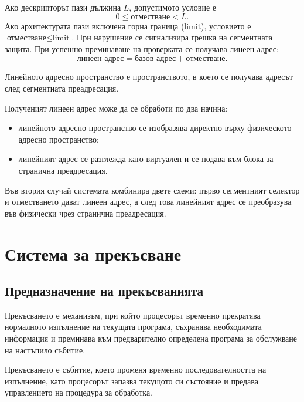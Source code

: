Ако дескрипторът пази дължина $L$, допустимото условие е
\[
0\leq \text{отместване}<L.
\]
Ако архитектурата пази включена горна граница (limit), условието е \(\text{отместване}\leq\text{limit}\). При нарушение се сигнализира грешка на сегментната защита. При успешно преминаване на проверката се получава линеен адрес:
\[
\text{линеен адрес}=\text{базов адрес}+\text{отместване}.
\]

\begin{defn}
Линейното адресно пространство е пространството, в което се получава адресът след сегментната преадресация.
\end{defn}

Полученият линеен адрес може да се обработи по два начина:

\begin{itemize}
    \item линейното адресно пространство се изобразява директно върху физическото адресно пространство;
    \item линейният адрес се разглежда като виртуален и се подава към блока за странична преадресация.
\end{itemize}

Във втория случай системата комбинира двете схеми: първо сегментният селектор и отместването дават линеен адрес, а след това линейният адрес се преобразува във физически чрез странична преадресация.

\section{Система за прекъсване}\label{s:10.4}

\subsection{Предназначение на прекъсванията}\label{s:10.4.1}

Прекъсването е механизъм, при който процесорът временно прекратява нормалното изпълнение на текущата програма, съхранява необходимата информация и преминава към предварително определена програма за обслужване на настъпило събитие.

\begin{defn}[Прекъсване]
Прекъсването е събитие, което променя временно последователността на изпълнение, като процесорът запазва текущото си състояние и предава управлението на процедура за обработка.
\end{defn}

